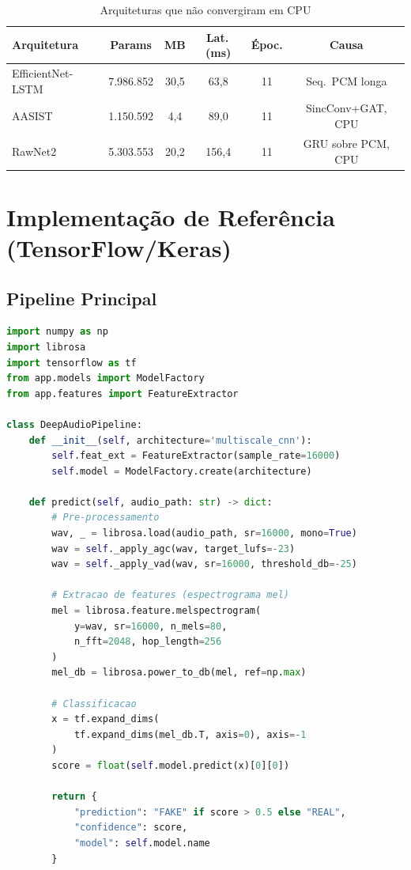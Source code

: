 \documentclass[12pt,a4paper]{article}
\begin{document}
\begin{table}[H]
\centering
\caption{Arquiteturas que n\~{a}o convergiram em CPU}
\small
\begin{tabular}{lccccc}
\toprule
\textbf{Arquitetura} & \textbf{Params} & \textbf{MB} &
\textbf{Lat.\,(ms)} & \textbf{\'{E}poc.} & \textbf{Causa} \\
\midrule
EfficientNet-LSTM & 7.986.852 & 30,5 & 63,8 & 11 & Seq.\ PCM longa \\
AASIST & 1.150.592 & 4,4 & 89,0 & 11 & SincConv+GAT, CPU \\
RawNet2 & 5.303.553 & 20,2 & 156,4 & 11 & GRU sobre PCM, CPU \\
\bottomrule
\end{tabular}
\end{table}

\section{Implementa\c{c}\~{a}o de Refer\^{e}ncia (TensorFlow/Keras)}

\subsection{Pipeline Principal}

\begin{lstlisting}[language=Python,
caption={Estrutura Principal do Pipeline (TensorFlow/Keras)}]
import numpy as np
import librosa
import tensorflow as tf
from app.models import ModelFactory
from app.features import FeatureExtractor

class DeepAudioPipeline:
    def __init__(self, architecture='multiscale_cnn'):
        self.feat_ext = FeatureExtractor(sample_rate=16000)
        self.model = ModelFactory.create(architecture)

    def predict(self, audio_path: str) -> dict:
        # Pre-processamento
        wav, _ = librosa.load(audio_path, sr=16000, mono=True)
        wav = self._apply_agc(wav, target_lufs=-23)
        wav = self._apply_vad(wav, sr=16000, threshold_db=-25)

        # Extracao de features (espectrograma mel)
        mel = librosa.feature.melspectrogram(
            y=wav, sr=16000, n_mels=80,
            n_fft=2048, hop_length=256
        )
        mel_db = librosa.power_to_db(mel, ref=np.max)

        # Classificacao
        x = tf.expand_dims(
            tf.expand_dims(mel_db.T, axis=0), axis=-1
        )
        score = float(self.model.predict(x)[0][0])

        return {
            "prediction": "FAKE" if score > 0.5 else "REAL",
            "confidence": score,
            "model": self.model.name
        }
\end{lstlisting}
\end{document}
